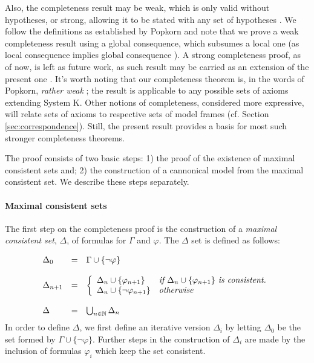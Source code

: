 \documentclass[3p,times]{elsarticle}
\begin{document}
Also, the completeness result may be
weak, which is only valid without hypotheses, or strong, allowing it to be stated with any set of
hypotheses \cite{blackburn}. We follow the definitions as established by Popkorn \cite{Popkorn_1994}
and note that we prove a weak completeness result using a global consequence, which subsumes a local one (as local consequence implies global consequence
\cite{de1999global}). A strong completeness proof, as of now, is left as future work, as such result may be carried as an extension of the present one \cite{Popkorn_1994}.
It's worth noting that our completeness theorem is, in the words of
Popkorn, \emph{rather weak} \cite[p. 119-120]{Popkorn_1994}; the result is applicable to any
possible sets of axioms extending System K. Other
notions of completeness, considered more expressive, will relate sets of axioms
to respective sets of model frames (cf. Section \ref{sec:correspondence}). Still, the present result provides a basis
for most such stronger completeness theorems.


The proof consists of two
basic steps: 1) the proof of the existence of maximal consistent sets and; 2) the
construction of a cannonical model from the maximal consistent set. We describe these steps separately.

\paragraph{Maximal consistent sets} The first step on the completeness proof is the construction of a \emph{maximal consistent set}, $\Delta$, of formulas for $\Gamma$ and $\varphi$.  The $\Delta$ set
is defined as follows:

\[
  \begin{array}{lcl}
    \Delta_{0}    & = & \Gamma \cup \{\neg \varphi\}\\ \\
    \Delta_{n + 1} & = & \left \{
                         \begin{array}{ll}
                           \Delta_{n} \cup \{ \varphi_{n + 1}\}      & \emph{if }\Delta_{n} \cup \{\varphi_{n + 1}\} \emph{ is consistent.}\\
                           \Delta_{n} \cup \{\neg \varphi_{n  + 1}\} & \emph{otherwise}\\
                         \end{array}
                         \right. \\ & & \\
    \Delta        & = & \bigcup_{n \in \mathbb{N}} \Delta_{n}
  \end{array}
\]
In order to define $\Delta$, we first define an iterative version $\Delta_{i}$ by letting $\Delta_{0}$ be the
set formed by $\Gamma \cup \{\neg\varphi\}$. Further steps in the construction of $\Delta_{i}$ are made by
the inclusion of formulas $\varphi_{i}$ which keep the set consistent.
\end{document}
